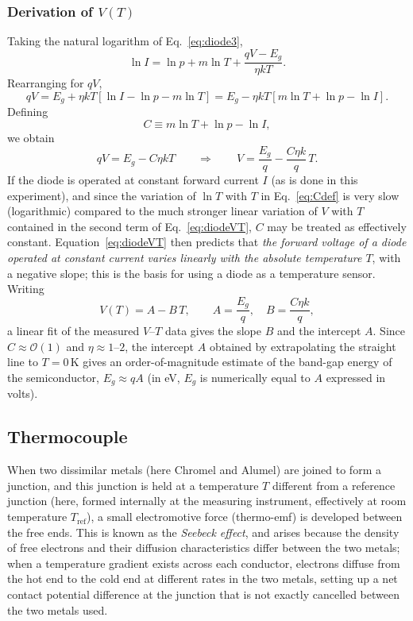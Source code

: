 \documentclass[11pt,a4paper]{article}
\begin{document}
\subsubsection*{Derivation of $V(T)$}
Taking the natural logarithm of Eq.~\eqref{eq:diode3},
\begin{equation}
    \ln I = \ln p + m\ln T + \frac{qV - E_g}{\eta k T}.
\end{equation}
Rearranging for $qV$,
\begin{equation}
    qV = E_g + \eta k T\left[\ln I - \ln p - m\ln T\right]
       = E_g - \eta k T\left[m\ln T + \ln p - \ln I\right].
\end{equation}
Defining
\begin{equation}
    C \equiv m\ln T + \ln p - \ln I,
    \label{eq:Cdef}
\end{equation}
we obtain
\begin{equation}
    qV = E_g - C\eta k T
    \qquad\Longrightarrow\qquad
    \boxed{V = \frac{E_g}{q} - \frac{C\eta k}{q}\,T}.
    \label{eq:diodeVT}
\end{equation}
If the diode is operated at constant forward current $I$ (as is done in this experiment), and since the variation of $\ln T$ with $T$ in Eq.~\eqref{eq:Cdef} is very slow (logarithmic) compared to the much stronger linear variation of $V$ with $T$ contained in the second term of Eq.~\eqref{eq:diodeVT}, $C$ may be treated as effectively constant. Equation~\eqref{eq:diodeVT} then predicts that \emph{the forward voltage of a diode operated at constant current varies linearly with the absolute temperature $T$}, with a negative slope; this is the basis for using a diode as a temperature sensor. Writing
\begin{equation}
    V(T) = A - B\,T, \qquad A = \frac{E_g}{q}, \quad B = \frac{C\eta k}{q},
    \label{eq:diodefit}
\end{equation}
a linear fit of the measured $V$--$T$ data gives the slope $B$ and the intercept $A$. Since $C\approx \mathcal{O}(1)$ and $\eta \approx 1$--$2$, the intercept $A$ obtained by extrapolating the straight line to $T=0\,\mathrm{K}$ gives an order-of-magnitude estimate of the band-gap energy of the semiconductor, $E_g \approx qA$ (in eV, $E_g$ is numerically equal to $A$ expressed in volts).

\subsection{Thermocouple}
When two dissimilar metals (here Chromel and Alumel) are joined to form a junction, and this junction is held at a temperature $T$ different from a reference junction (here, formed internally at the measuring instrument, effectively at room temperature $T_{\mathrm{ref}}$), a small electromotive force (thermo-emf) is developed between the free ends. This is known as the \emph{Seebeck effect}, and arises because the density of free electrons and their diffusion characteristics differ between the two metals; when a temperature gradient exists across each conductor, electrons diffuse from the hot end to the cold end at different rates in the two metals, setting up a net contact potential difference at the junction that is not exactly cancelled between the two metals used.
\end{document}
